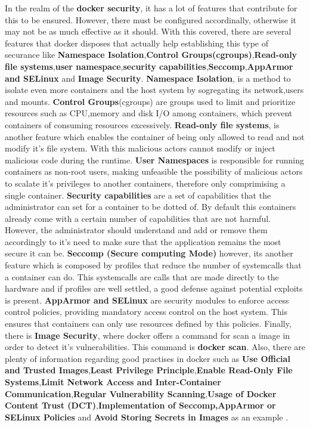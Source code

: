 In the realm of the \textbf{docker security}, it has a lot of features that contribute for this to be ensured. However, there must be configured accordinally, otherwise it may not be as much effective as it should. With this covered, there are several features that docker disposes that actually help establishing this type of securance like \textbf{Namespace Isolation},\textbf{Control Groups(cgroups)},\textbf{Read-only file systems},\textbf{user namespace},\textbf{security capabilities},\textbf{Seccomp},\textbf{AppArmor and SELinux} and \textbf{Image Security}. \textbf{Namespace Isolation}, is a method to isolate even more containers and the host system by sogregating its network,users and mounts. \textbf{Control Groups}(cgroups) are groups used to limit and prioritize resources such as CPU,memory and disk I/O among containers, which prevent containers of consuming resources excessively. \textbf{Read-only file systems}, is another feature which enables the container of being only allowed to read and not modify it's file system. With this malicious actors cannot modify or inject malicious code during the runtime. \textbf{User Namespaces} is responsible for running containers as non-root users, making unfeasible the possibility of malicious actors to scalate it's privileges to another containers, therefore only comprimising a single container. \textbf{Security capabilities} are a set of capabilities that the administrator can set for a container to be dotted of. By default this containers already come with a certain number of capabilities that are not harmful. However, the administrator should understand and add or remove them accordingly to it's need to make sure that the application remains the most secure it can be. \textbf{Seccomp (Secure computing Mode)} however, its another feature which is composed by profiles that reduce the number of systemcalls that a container can do. This systemcalls are calls that are made directly to the hardware and if profiles are well settled, a good defense against potential exploits is present. \textbf{AppArmor and SELinux} are security modules to enforce access control policies, providing mandatory access control on the host system. This ensures that containers can only use resources defined by this policies. Finally, there is \textbf{Image Security}, where docker offers a command for scan a image in order to detect it's vulnerabilities. This command is \textbf{docker scan}. Also, there are plenty of information regarding good practises in docker such as \textbf{Use Official and Trusted Images},\textbf{Least Privilege Principle},\textbf{Enable Read-Only File Systems},\textbf{Limit Network Access and Inter-Container Communication},\textbf{Regular Vulnerability Scanning},\textbf{Usage of Docker Content Trust (DCT)},\textbf{Implementation of Seccomp,AppArmor or SELinux Policies} and \textbf{Avoid Storing Secrets in Images} as an example \cite{docker-good-practises1} \cite{docker-good-practises-2} \cite{docker-good-practises-3} \cite{docker-good-practises-4}.

